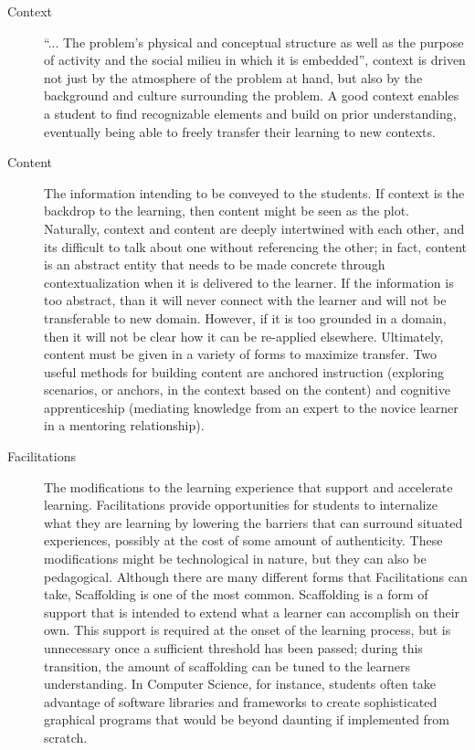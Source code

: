 \begin{description}
	\item[Context] ``... The problem's physical and conceptual structure as well as the purpose of activity and the social milieu in which it is embedded''\cite{rogoff1984everyday}, context is driven not just by the atmosphere of the problem at hand, but also by the background and culture surrounding the problem.
	A good context enables a student to find recognizable elements and build on prior understanding, eventually being able to freely transfer their learning to new contexts.
	\item[Content] The information intending to be conveyed to the students.
	If context is the backdrop to the learning, then content might be seen as the plot.
	Naturally, context and content are deeply intertwined with each other, and its difficult to talk about one without referencing the other; in fact, content is an abstract entity that needs to be made concrete through contextualization when it is delivered to the learner.
	If the information is too abstract, than it will never connect with the learner and will not be transferable to new domain.
	However, if it is too grounded in a domain, then it will not be clear how it can be re-applied elsewhere. 
	Ultimately, content must be given in a variety of forms to maximize transfer.
	Two useful methods for building content are anchored instruction (exploring scenarios, or anchors, in the context based on the content) and cognitive apprenticeship (mediating knowledge from an expert to the novice learner in a mentoring relationship).
	\item[Facilitations] The modifications to the learning experience that support and accelerate learning.
	Facilitations provide opportunities for students to internalize what they are learning by lowering the barriers that can surround situated experiences, possibly at the cost of some amount of authenticity. 
	These modifications might be technological in nature, but they can also be pedagogical.
	Although there are many different forms that Facilitations can take, Scaffolding is one of the most common.
	Scaffolding is a form of support that is intended to extend what a learner can accomplish on their own.
	This support is required at the onset of the learning process, but is unnecessary once a sufficient threshold has been passed; during this transition, the amount of scaffolding can be tuned to the learners understanding.
	In Computer Science, for instance, students often take advantage of software libraries and frameworks to create sophisticated graphical programs that would be beyond daunting if implemented from scratch.

\end{description}

